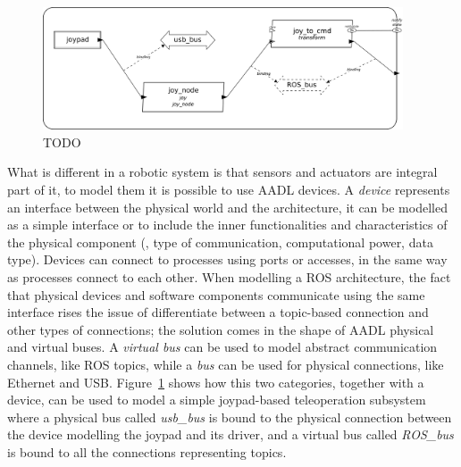 \begin{figure}[t]
    \centering
    \includegraphics[width=0.95\textwidth]{gfx/mini_arch}
    \caption{TODO}\label{fig:mini-arch}
\end{figure}

What is different in a robotic system is that sensors and actuators are integral part of it, to model them it is possible to use AADL devices. A \textit{device} represents an interface between the physical world and the architecture, it can be modelled as a simple interface or to include the inner functionalities and characteristics of the physical component (\eg, type of communication, computational power, data type).  Devices can connect to processes using ports or accesses, in the same way as processes connect to each other. When modelling a ROS architecture, the fact that physical devices and software components communicate using the same interface rises the issue of differentiate between a topic-based connection and other types of connections; the solution comes in the shape of AADL physical and virtual buses. A \textit{virtual bus} can be used to model abstract communication channels, like ROS topics, while a \textit{bus} can be used for physical connections, like Ethernet and USB. Figure~\ref{fig:mini-arch} shows how this two categories, together with a device, can be used to model a simple joypad-based teleoperation subsystem where a physical bus called \textit{usb\_bus} is bound to the physical connection between the device modelling the joypad and its driver, and a virtual bus called \textit{ROS\_bus} is bound to all the connections representing topics.

